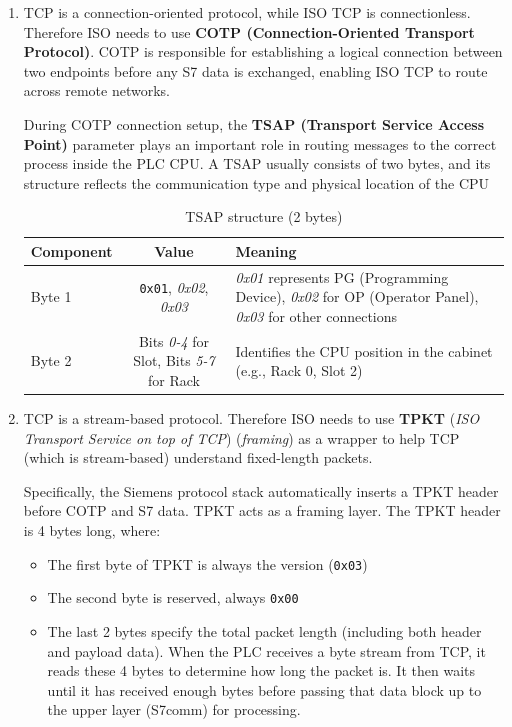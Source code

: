 \documentclass[../main.tex]{subfiles}
\begin{document}
\begin{enumerate}
    \item TCP is a connection-oriented protocol, while ISO TCP is connectionless. Therefore ISO needs to use \textbf{COTP (Connection-Oriented Transport Protocol)}. COTP is responsible for establishing a logical connection between two endpoints before any S7 data is exchanged, enabling ISO TCP to route across remote networks.

    During COTP connection setup, the \textbf{TSAP (Transport Service Access Point)} parameter plays an important role in routing messages to the correct process inside the PLC CPU. A TSAP usually consists of two bytes, and its structure reflects the communication type and physical location of the CPU

    \begin{table}[H]
        \centering
        \caption{TSAP structure (2 bytes)}
        \label{tab:tsap}
        \footnotesize
        \begin{tabular}{|l|c|p{7cm}|}
            \hline
            \textbf{Component} & \textbf{Value} & \textbf{Meaning} \\
            \hline
            Byte 1  & \texttt{0x01}, \textit{0x02}, \textit{0x03} & \textit{0x01} represents PG (Programming Device), \textit{0x02} for OP (Operator Panel), \textit{0x03} for other connections \\
            \hline
            Byte 2 & Bits \textit{0-4} for Slot, Bits \textit{5-7} for Rack & Identifies the CPU position in the cabinet (e.g., Rack 0, Slot 2) \\
            \hline
        \end{tabular}
    \end{table}

    \item TCP is a stream-based protocol. Therefore ISO needs to use \textbf{TPKT} (\textit{ISO Transport Service on top of TCP}) (\textit{framing}) as a wrapper to help TCP (which is stream-based) understand fixed-length packets.

    Specifically, the Siemens protocol stack automatically inserts a TPKT header before COTP and S7 data. TPKT acts as a framing layer. The TPKT header is 4 bytes long, where:

    \begin{itemize}
        \item The first byte of TPKT is always the version (\texttt{0x03})
        \item The second byte is reserved, always \texttt{0x00}
        \item The last 2 bytes specify the total packet length (including both header and payload data). When the PLC receives a byte stream from TCP, it reads these 4 bytes to determine how long the packet is. It then waits until it has received enough bytes before passing that data block up to the upper layer (S7comm) for processing.
    \end{itemize}
\end{enumerate}
\end{document}
